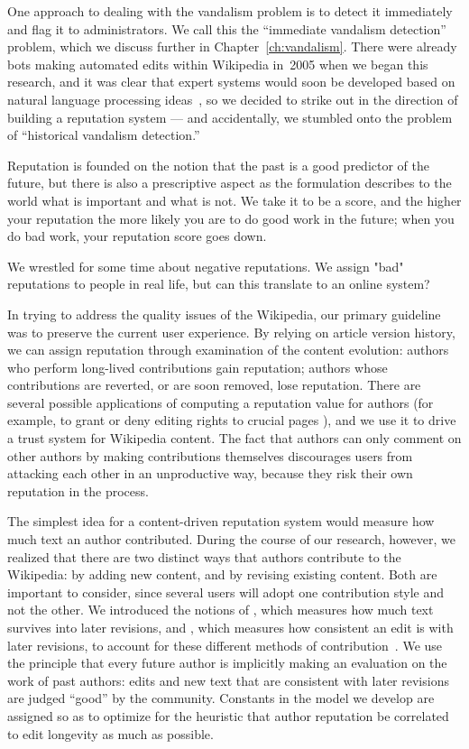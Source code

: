 One approach to dealing with the vandalism problem is to detect
it immediately and flag it to administrators.
We call this the ``immediate vandalism detection'' problem,
which we discuss further in Chapter~\ref{ch:vandalism}.
There were already bots making automated edits within Wikipedia
in~2005 when we began this research, and it was clear that
expert systems would soon be developed based on natural language processing
ideas~\cite{wiki:AntiVandalBot,wiki:MartinBot,wiki:ClueBot,Carter2007},
so we decided to strike out in the direction of building a reputation system
--- and accidentally, we stumbled onto the problem of
``historical vandalism detection.''


Reputation is founded on the notion that the past is a good
predictor of the future, but there is also a prescriptive aspect
as the formulation describes to the world what is important and
what is not.
We take it to be a score, and the higher your reputation the more
likely you are to do good work in the future; when you do bad
work, your reputation score goes down.

We wrestled for some time about negative reputations. We assign "bad"
reputations to people in real life, but can this translate to an online
system?  


In trying to address the quality issues of the Wikipedia,
our primary guideline was to preserve the current user experience.
By relying on article version history, we can assign reputation
through examination of the content evolution:
authors who perform long-lived contributions gain reputation; authors
whose contributions are reverted, or are soon removed, lose reputation.
There are several possible applications of computing a reputation
value for authors (for example, to grant or deny editing rights to
crucial pages \cite{Blaze96}), and we use it to drive a trust system for
Wikipedia content.
The fact that authors can only comment on other authors by
making contributions themselves discourages users from attacking
each other in an unproductive way, because they risk their own reputation in the process.


The simplest idea for a content-driven reputation system would measure
how much text an author contributed.
During the course of our research, however, we realized that there are
two distinct ways that authors contribute to the Wikipedia: by adding
new content, and by revising existing content.
Both are important to consider, since several users will
adopt one contribution style and not the other.
We introduced the notions of
, which measures how much text survives
into later revisions, and , which measures
how consistent an edit is with later revisions,
to account for these different methods of contribution~\cite{Adler2007}.
We use the principle that every future author is
implicitly making an evaluation on the work of past authors:
edits and new text that are consistent with later revisions
are judged ``good'' by the community.
Constants in the model we develop are assigned so as to optimize
for the heuristic that author reputation
be correlated to edit longevity as much as possible.

